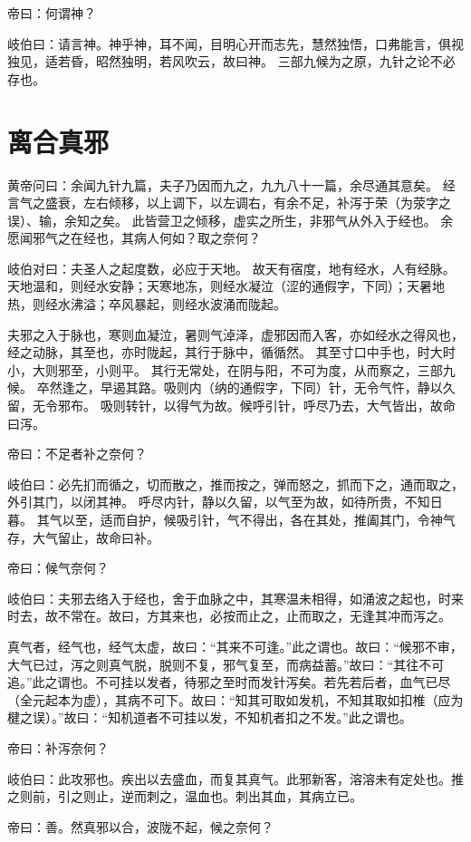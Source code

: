 \documentclass{article}%
\begin{document}
帝曰：何谓神？

岐伯曰：请言神。神乎神，耳不闻，目明心开而志先，慧然独悟，口弗能言，俱视独见，适若昏，昭然独明，若风吹云，故曰神。
三部九候为之原，九针之论不必存也。


\section{离合真邪}
黄帝问曰：余闻九针九篇，夫子乃因而九之，九九八十一篇，余尽通其意矣。
经言气之盛衰，左右倾移，以上调下，以左调右，有余不足，补泻于荣（为荥字之误）、输，余知之矣。
此皆营卫之倾移，虚实之所生，非邪气从外入于经也。
余愿闻邪气之在经也，其病人何如？取之奈何？

岐伯对曰：夫圣人之起度数，必应于天地。
故天有宿度，地有经水，人有经脉。
天地温和，则经水安静；天寒地冻，则经水凝泣（涩的通假字，下同）；天暑地热，则经水沸溢；卒风暴起，则经水波涌而陇起。

夫邪之入于脉也，寒则血凝泣，暑则气淖泽，虚邪因而入客，亦如经水之得风也，经之动脉，其至也，亦时陇起，其行于脉中，循循然。
其至寸口中手也，时大时小，大则邪至，小则平。
其行无常处，在阴与阳，不可为度，从而察之，三部九候。
卒然逢之，早遏其路。吸则内（纳的通假字，下同）针，无令气忤，静以久留，无令邪布。
吸则转针，以得气为故。候呼引针，呼尽乃去，大气皆出，故命曰泻。

帝曰：不足者补之奈何？

岐伯曰：必先扪而循之，切而散之，推而按之，弹而怒之，抓而下之，通而取之，外引其门，以闭其神。
呼尽内针，静以久留，以气至为故，如待所贵，不知日暮。
其气以至，适而自护，候吸引针，气不得出，各在其处，推阖其门，令神气存，大气留止，故命曰补。

帝曰：候气奈何？

岐伯曰：夫邪去络入于经也，舍于血脉之中，其寒温未相得，如涌波之起也，时来时去，故不常在。故曰，方其来也，必按而止之，止而取之，无逢其冲而泻之。

真气者，经气也，经气太虚，故曰：“其来不可逢。”此之谓也。故曰：“候邪不审，大气已过，泻之则真气脱，脱则不复，邪气复至，而病益蓄。”故曰：“其往不可追。”此之谓也。不可挂以发者，待邪之至时而发针泻矣。若先若后者，血气已尽（全元起本为虚），其病不可下。故曰：“知其可取如发机，不知其取如扣椎（应为楗之误）。”故曰：“知机道者不可挂以发，不知机者扣之不发。”此之谓也。

帝曰：补泻奈何？

岐伯曰：此攻邪也。疾出以去盛血，而复其真气。此邪新客，溶溶未有定处也。推之则前，引之则止，逆而刺之，温血也。刺出其血，其病立已。

帝曰：善。然真邪以合，波陇不起，候之奈何？
\end{document}
